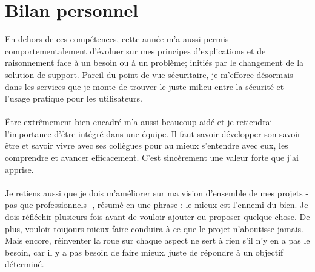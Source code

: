 \section{Bilan personnel}

En dehors de ces compétences, cette année m'a aussi permis comportementalement d'évoluer sur mes principes d'explications et de raisonnement face à un besoin ou à un problème; initiés par le changement de la solution de support. Pareil du point de vue sécuritaire, je m'efforce désormais dans les services que je monte de trouver le juste milieu entre la sécurité et l'usage pratique pour les utilisateurs.
\\ \\
Être extrêmement bien encadré m'a aussi beaucoup aidé et je retiendrai l'importance d'être intégré dans une équipe. Il faut savoir développer son savoir être et savoir vivre avec ses collègues pour au mieux s'entendre avec eux, les comprendre et avancer efficacement. C'est sincèrement une valeur forte que j'ai apprise.
\\ \\
Je retiens aussi que je dois m'améliorer sur ma vision d'ensemble de mes projets - pas que professionnels -, résumé en une phrase : le mieux est l'ennemi du bien. Je dois réfléchir plusieurs fois avant de vouloir ajouter ou proposer quelque chose. De plus, vouloir toujours mieux faire conduira à ce que le projet n'aboutisse jamais. Mais encore, réinventer la roue sur chaque aspect ne sert à rien s'il n'y en a pas le besoin, car il y a pas besoin de faire mieux, juste de répondre à un objectif déterminé.

\newpage